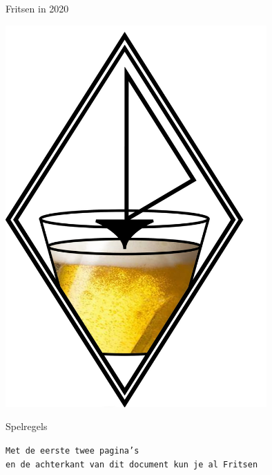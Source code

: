 \thispagestyle{empty}
\begingroup
    \fontsize{80pt}{82pt}\selectfont
    \begin{center}
        Fritsen in 2020  
    \end{center}
\endgroup

\vspace{0.55cm}

\begin{center}
    \includegraphics[width=10cm]{bier.jpeg}
\end{center}

\begingroup
    \fontsize{80pt}{82pt}\selectfont
    \begin{center}
        Spelregels  
    \end{center}
\endgroup

\vspace{0.1cm}

\begingroup
    \fontsize{30pt}{32pt}\selectfont
    \begin{center}
        \texttt{Met de eerste twee pagina's \\en de achterkant van dit document kun je al Fritsen}
    \end{center}
\endgroup

\newpage